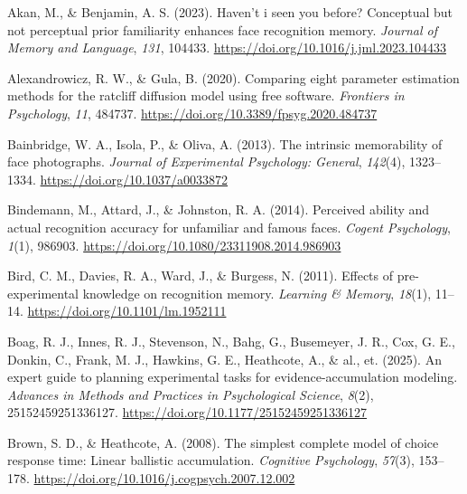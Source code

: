 \documentclass[
  letterpaper,
  DIV=11,
  numbers=noendperiod]{scrartcl}
\newlength{\cslhangindent}
\newenvironment{CSLReferences}[2] %
 {\begin{list}{}{%
  \setlength{\itemindent}{0pt}
  \setlength{\leftmargin}{0pt}
  \setlength{\parsep}{0pt}
  \ifodd #1
   \setlength{\leftmargin}{\cslhangindent}
   \setlength{\itemindent}{-1\cslhangindent}
  \fi
  \setlength{\itemsep}{#2\baselineskip}}}
 {\end{list}}
\begin{document}
\protect{}\label{refs}
\begin{CSLReferences}{1}{0}
Akan, M., \& Benjamin, A. S. (2023). Haven't i seen you before?
Conceptual but not perceptual prior familiarity enhances face
recognition memory. \emph{Journal of Memory and Language}, \emph{131},
104433. \url{https://doi.org/10.1016/j.jml.2023.104433}

Alexandrowicz, R. W., \& Gula, B. (2020). Comparing eight parameter
estimation methods for the ratcliff diffusion model using free software.
\emph{Frontiers in Psychology}, \emph{11}, 484737.
\url{https://doi.org/10.3389/fpsyg.2020.484737}

Bainbridge, W. A., Isola, P., \& Oliva, A. (2013). The intrinsic
memorability of face photographs. \emph{Journal of Experimental
Psychology: General}, \emph{142}(4), 1323--1334.
\url{https://doi.org/10.1037/a0033872}

Bindemann, M., Attard, J., \& Johnston, R. A. (2014). Perceived ability
and actual recognition accuracy for unfamiliar and famous faces.
\emph{Cogent Psychology}, \emph{1}(1), 986903.
\url{https://doi.org/10.1080/23311908.2014.986903}

Bird, C. M., Davies, R. A., Ward, J., \& Burgess, N. (2011). Effects of
pre-experimental knowledge on recognition memory. \emph{Learning \&
Memory}, \emph{18}(1), 11--14. \url{https://doi.org/10.1101/lm.1952111}

{Boag, R. J., Innes, R. J., Stevenson, N., Bahg, G., Busemeyer, J. R.,
Cox, G. E., Donkin, C., Frank, M. J., Hawkins, G. E., Heathcote, A., \&
al., et}. (2025). An expert guide to planning experimental tasks for
evidence-accumulation modeling. \emph{Advances in Methods and Practices
in Psychological Science}, \emph{8}(2), 25152459251336127.
\url{https://doi.org/10.1177/25152459251336127}

Brown, S. D., \& Heathcote, A. (2008). The simplest complete model of
choice response time: Linear ballistic accumulation. \emph{Cognitive
Psychology}, \emph{57}(3), 153--178.
\url{https://doi.org/10.1016/j.cogpsych.2007.12.002}


\end{CSLReferences}
\end{document}

